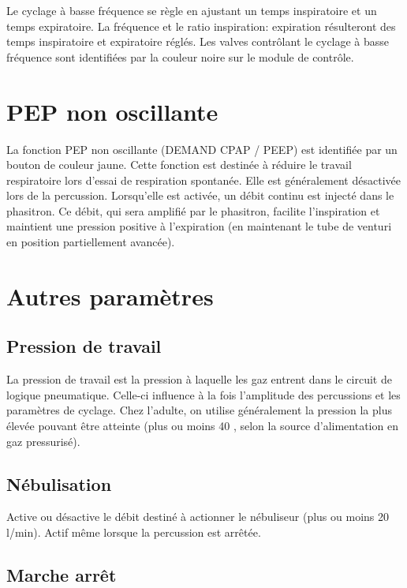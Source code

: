 Le cyclage à basse fréquence se règle en ajustant un temps
	inspiratoire et un temps expiratoire.  La fréquence et le ratio
	inspiration: expiration résulteront des temps inspiratoire et
	expiratoire réglés. Les valves contrôlant le cyclage à basse
	fréquence sont identifiées par la couleur noire sur le module de
	contrôle.

\section{PEP non oscillante}

La fonction PEP non oscillante (DEMAND CPAP / PEEP) est identifiée par
	un bouton de couleur jaune.  Cette fonction est destinée à réduire
	le travail respiratoire lors d'essai de respiration spontanée. Elle
	est généralement désactivée lors de la percussion. Lorsqu'elle est
	activée, un débit continu est injecté dans le phasitron. Ce débit,
	qui sera amplifié par le phasitron, facilite l’inspiration et
	maintient une pression positive à l'expiration (en maintenant le
	tube de venturi en position partiellement avancée).  

\section{Autres paramètres}

\subsection{Pression de travail}

La pression de travail est la pression à laquelle les gaz entrent dans
	le circuit de logique pneumatique. Celle-ci influence à la fois
	l'amplitude des percussions et les paramètres de cyclage. Chez
	l'adulte, on utilise généralement la pression la plus élevée pouvant
	être atteinte (plus ou moins 40 \psi, selon la source d'alimentation
	en gaz pressurisé).


\subsection{Nébulisation}

Active ou désactive le débit destiné à actionner le nébuliseur (plus
ou moins 20 l/min). Actif même lorsque la percussion est arrêtée. 

\subsection{Marche arrêt}

